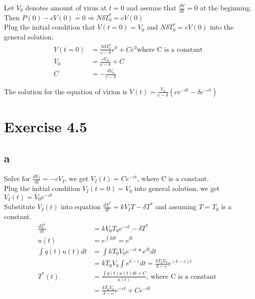 \documentclass[11pt,letterpaper]{article}
\begin{document}
\noindent Let $V_0$ denotes amount of virus at $t = 0$ and  assume that $\frac{dV}{dt} = 0$ at the beginning. \\

\noindent Then $P(0) - cV(0) = 0 \Rightarrow N \delta T^*_0 = cV(0)$ \\

\noindent Plug the initial condition that $V(t=0) = V_0$ and $N \delta T^*_0 = cV(0)$ into the general solution. 
\begin{align*}
V(t = 0) &= \frac{N \delta T_0^*}{c - \delta} e^{0} + C e^{0} \text{where C is a constant} \\
V_0 &= \frac{c V_0}{c - \delta} + C \\
C &= -\frac{\delta V_0}{c - \delta}
\end{align*}

\noindent The solution for the equation of virion is $V(t) = \frac{V_0}{c - \delta} (ce^{- \delta t} - \delta e^{- c t})$

\newpage
\section*{Exercise 4.5}
\subsection*{a}
\noindent Solve for $\frac{dV_I}{dt} = -cV_I$, we get $V_I(t) = Ce^{-c t}$, where C is a constant. \\

\noindent Plug the initial condition $V_I(t = 0) = V_0$ into general solution, we get $V_I(t) = V_0 e^{-c t}$ \\

\noindent Substitute $V_I(t)$ into equation $\frac{d T^*}{dt} = k V_I T - \delta T^*$ and assuming $T = T_0$ is a constant. 
\begin{align*}
\frac{d T^*}{dt} &= k V_0 T_0 e^{-ct} - \delta T^* \\
u(t) &= e^{\int \delta dt} = e^{\delta t } \\
\int q(t) u(t) dt &= \int k T_0 V_0 e^{-ct} * e^{\delta t} dt \\
&= k T_0 V_0 \int e^{\delta - c} dt = \frac{k T_0 V_0 }{\delta - c} e^{(\delta - c) t} \\
T^*(t) &= \frac{\int q(t) u(t) dt + C}{u(t)} \text{, where C is a constant }\\
& = \frac{k T_0 V_0 }{\delta - c} e^{-ct} + Ce^{-\delta t} 
\end{align*}
\end{document}
